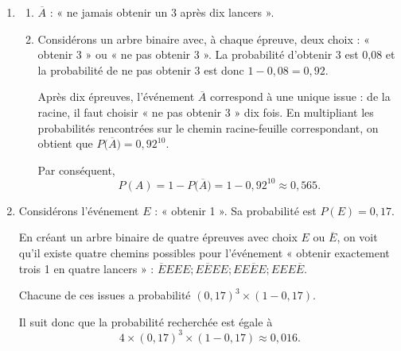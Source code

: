 {\begin{enumerate}
	\end{enumerate}
	\begin{enumerate}[resume]
		\item 
			\begin{enumerate}
				\item 
				$\overline{A}$ : « ne jamais obtenir un 3 après dix lancers ».
				\item 
				Considérons un arbre binaire avec, à chaque épreuve, deux choix : « obtenir 3 » ou « ne pas obtenir 3 ».
				La probabilité d'obtenir 3 est 0,08 et la probabilité de ne pas obtenir 3 est donc $1-0,08 = 0,92$.
				
				Après dix épreuves, l'événement $\overline{A}$ correspond à une unique issue : de la racine, il faut choisir « ne pas obtenir 3 » dix fois.
				En multipliant les probabilités rencontrées sur le chemin racine-feuille correspondant, on obtient que $P\bigl(\overline{A}\bigr) = 0,92^{10}$.
				
				Par conséquent, 
					\[ P(A) = 1 - P\bigl(\overline{A}\bigr) = 1 - 0,92^{10} \approx 0,565. \]
			\end{enumerate}
		\item 
		Considérons l'événement $E$ : « obtenir 1 ». Sa probabilité est $P(E) = 0,17$.
		
		En créant un arbre binaire de quatre épreuves avec choix $E$ ou $\overline{E}$, on voit qu'il existe quatre chemins possibles pour l'événement « obtenir exactement trois 1 en quatre lancers » : $\overline{E}EEE ; E\overline{E}EE ; EE\overline{E}E ; EEE\overline{E}$.
		
		Chacune de ces issues a probabilité $(0,17)^3 \times (1-0,17)$.
		
		Il suit donc que la probabilité recherchée est égale à
			\[ 4 \times (0,17)^3 \times (1-0,17) \approx 0,016. \]
	\end{enumerate}
}

